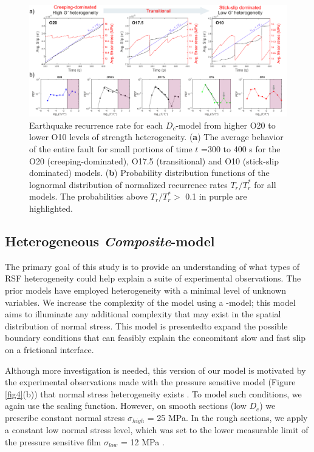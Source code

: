 \documentclass[preprint,1p, 10pt,authoryear]{elsarticle}
\begin{document}
\begin{figure}
    	\centering
	\includegraphics[scale = 0.9]{FIG11_revised.pdf} 
	\caption{Earthquake recurrence rate for each $D_{c}$-model from higher O20 to lower O10 levels of strength heterogeneity. (\textbf{a}) The average behavior of the entire fault for small portions of time $t$ =300 to 400 s for the O20 (creeping-dominated), O17.5 (transitional) and O10 (stick-slip dominated) models. (\textbf{b}) Probability distribution functions of the lognormal distribution of normalized recurrence rates $T_{r}/T^{*}_{r}$ for all models. The probabilities above $T_{r}/T^{*}_{r} >$ 0.1 in purple are highlighted.}
	\label{fig11}
\end{figure}
\subsection{Heterogeneous \textit{Composite}-model}
The primary goal of this study is to provide an understanding of what types of RSF heterogeneity could help explain a suite of experimental observations. The prior models have employed heterogeneity with a minimal level of unknown variables. We increase the complexity of the model using a -model; this model aims to illuminate any additional complexity that may exist in the spatial distribution of normal stress. This model is presentedto expand the possible boundary conditions that can feasibly explain the concomitant slow and fast slip on a frictional interface. 

Although more investigation is needed, this version of our model is motivated by the experimental observations made with the pressure sensitive model (Figure \ref{fig4}(b)) that normal stress heterogeneity exists \citep{Selvadurai2017}. To model such conditions, we again use the scaling function. However, on smooth sections (low $D_{c}$) we prescribe constant normal stress $\sigma_{high}$ = 25 MPa.  In the rough sections, we apply a constant low normal stress level, which was set to the lower measurable limit of the pressure sensitive film $\sigma_{low}$ = 12 MPa \citep{Selvadurai2015a}. 
\end{document}
